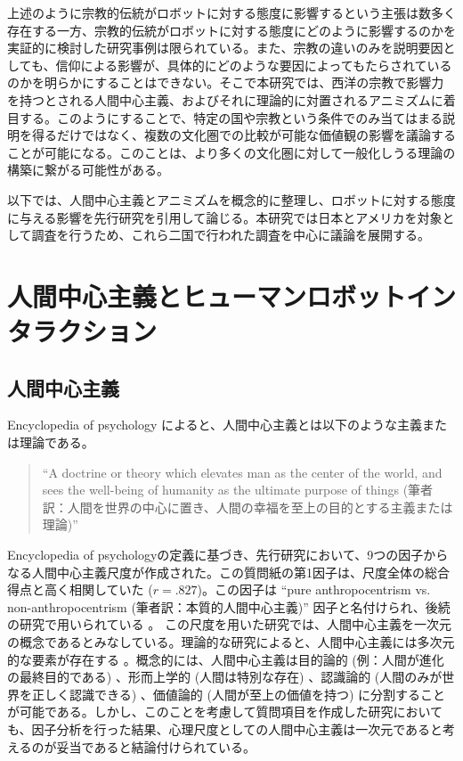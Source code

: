 \documentclass[a4j,12pt]{jreport}
\begin{document}
上述のように宗教的伝統がロボットに対する態度に影響するという主張は数多く存在する一方、宗教的伝統がロボットに対する態度にどのように影響するのかを実証的に検討した研究事例は限られている。また、宗教の違いのみを説明要因としても、信仰による影響が、具体的にどのような要因によってもたらされているのかを明らかにすることはできない。そこで本研究では、西洋の宗教で影響力を持つとされる人間中心主義、およびそれに理論的に対置される\cite{mania, gygi}アニミズムに着目する。このようにすることで、特定の国や宗教という条件でのみ当てはまる説明を得るだけではなく、複数の文化圏での比較が可能な価値観の影響を議論することが可能になる。このことは、より多くの文化圏に対して一般化しうる理論の構築に繋がる可能性がある。


以下では、人間中心主義とアニミズムを概念的に整理し、ロボットに対する態度に与える影響を先行研究を引用して論じる。本研究では日本とアメリカを対象として調査を行うため、これら二国で行われた調査を中心に議論を展開する。



\section{人間中心主義とヒューマンロボットインタラクション}
\subsection{人間中心主義}
Encyclopedia of psychology \cite{eye}によると、人間中心主義とは以下のような主義または理論である。
\begin{quote}
``A doctrine or theory which elevates man as the center of the world, and sees the well-being of humanity as the ultimate purpose of things (筆者訳：人間を世界の中心に置き、人間の幸福を至上の目的とする主義または理論)''
\end{quote}



Encyclopedia of psychologyの定義に基づき、先行研究\cite{chand}において、9つの因子からなる人間中心主義尺度が作成された。この質問紙の第1因子は、尺度全体の総合得点と高く相関していた ($r = .827$)。この因子は ``pure anthropocentrism vs. non-anthropocentrism (筆者訳：本質的人間中心主義)'' 因子と名付けられ、後続の研究で用いられている\cite{kozoku} 。
この尺度を用いた研究では、人間中心主義を一次元の概念であるとみなしている。理論的な研究によると、人間中心主義には多次元的な要素が存在する\cite{fortu} 。概念的には、人間中心主義は目的論的 (例：人間が進化の最終目的である) 、形而上学的 (人間は特別な存在) 、認識論的 (人間のみが世界を正しく認識できる) 、価値論的 (人間が至上の価値を持つ) に分割することが可能である。しかし、このことを考慮して質問項目を作成した研究\cite{fortu}においても、因子分析を行った結果、心理尺度としての人間中心主義は一次元であると考えるのが妥当であると結論付けられている。
\end{document}
